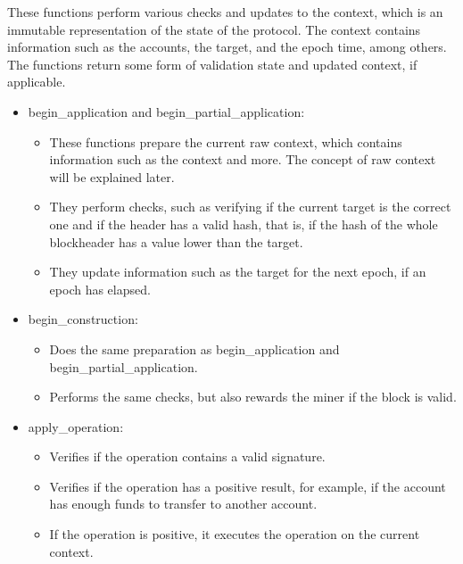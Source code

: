 These functions perform various checks and updates to the context, which is an immutable representation of the state of the protocol. The context contains information such as the accounts, the target, and the epoch time, among others. The functions return some form of validation state and updated context, if applicable.

\begin{itemize}

    \item begin\_application and begin\_partial\_application:
        \begin{itemize}
            \item These functions prepare the current raw context, which contains information such as the context and more. The concept of raw context will be explained later.
            \item They perform checks, such as verifying if the current target is the correct one and if the header has a valid hash, that is, if the hash of the whole blockheader has a value lower than the target.
            \item They update information such as the target for the next epoch, if an epoch has elapsed.
        \end{itemize}
    \item begin\_construction:

        \begin{itemize}
            \item Does the same preparation as begin\_application and begin\_partial\_application.
            \item Performs the same checks, but also rewards the miner if the block is valid.
        \end{itemize}

    \item apply\_operation:
        \begin{itemize}
            \item Verifies if the operation contains a valid signature.
            \item Verifies if the operation has a positive result, for example, if the account has enough funds to transfer to another account.
            \item If the operation is positive, it executes the operation on the current context.
        \end{itemize}


\end{itemize}
